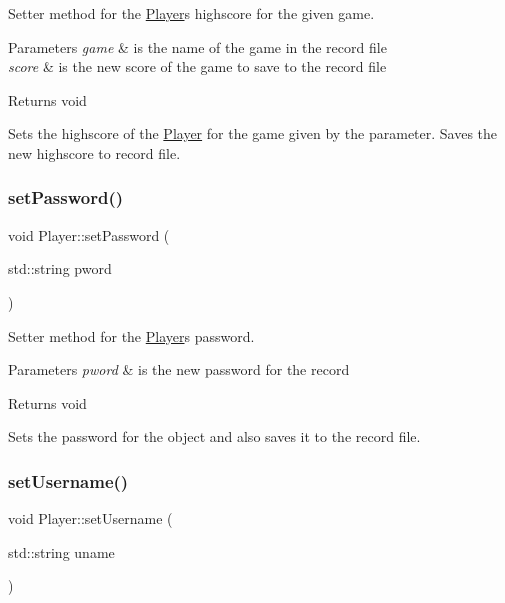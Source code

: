 Setter method for the \mbox{\hyperlink{class_player}{Player}}\textquotesingle{}s highscore for the given game. 


\begin{DoxyParams}{Parameters}
{\em game} & is the name of the game in the record file \\
\hline
{\em score} & is the new score of the game to save to the record file \\
\hline
\end{DoxyParams}
\begin{DoxyReturn}{Returns}
void
\end{DoxyReturn}
Sets the highscore of the \mbox{\hyperlink{class_player}{Player}} for the game given by the parameter. Saves the new highscore to record file. \mbox{\label{class_player_afff83ec36cc74b248cf1a723ab0c2b6a}} 
\subsubsection{\texorpdfstring{set\+Password()}{setPassword()}}
{\footnotesize\ttfamily void Player\+::set\+Password (\begin{DoxyParamCaption}\item[{std\+::string}]{pword }\end{DoxyParamCaption})}



Setter method for the \mbox{\hyperlink{class_player}{Player}}\textquotesingle{}s password. 


\begin{DoxyParams}{Parameters}
{\em pword} & is the new password for the record \\
\hline
\end{DoxyParams}
\begin{DoxyReturn}{Returns}
void
\end{DoxyReturn}
Sets the password for the object and also saves it to the record file. \mbox{\label{class_player_a8fc488bcda5714ae92466d2936380787}} 
\subsubsection{\texorpdfstring{set\+Username()}{setUsername()}}
{\footnotesize\ttfamily void Player\+::set\+Username (\begin{DoxyParamCaption}\item[{std\+::string}]{uname }\end{DoxyParamCaption})}



